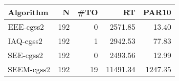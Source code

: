 \begin{tabular}{lrrrr}
\toprule
 Algorithm &   N &  \#TO &       RT &   PAR10 \\
\midrule
 EEE-cgss2 & 192 &    0 &  2571.85 &   13.40 \\
 IAQ-cgss2 & 192 &    1 &  2942.53 &   77.83 \\
 SEE-cgss2 & 192 &    0 &  2493.56 &   12.99 \\
SEEM-cgss2 & 192 &   19 & 11491.34 & 1247.35 \\
\bottomrule
\end{tabular}
